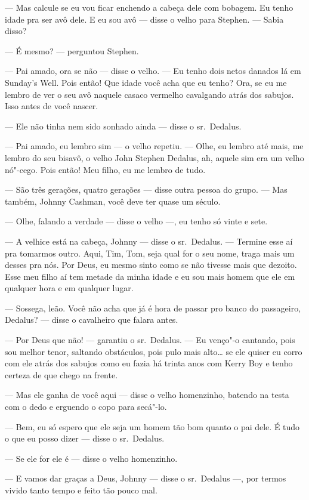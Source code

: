  --- Mas calcule se eu vou ficar enchendo a cabeça dele com bobagem. Eu
tenho idade pra ser avô dele. E eu sou avô --- disse o velho para Stephen.
 --- Sabia disso?

 --- É mesmo? --- perguntou Stephen.

 --- Pai amado, ora se não --- disse o velho. --- Eu tenho dois netos danados lá
em Sunday’s Well. Pois então! Que idade você acha que
eu tenho? Ora, se eu me lembro de ver o seu avô naquele casaco vermelho
cavalgando atrás dos sabujos. Isso antes de você nascer.

 --- Ele não tinha nem sido sonhado ainda --- disse o sr.~Dedalus.

 --- Pai amado, eu lembro sim --- o velho repetiu. --- Olhe, eu lembro até mais, me
lembro do seu bisavô, o velho John Stephen Dedalus, ah, aquele sim era
um velho nó"-cego. Pois então! Meu filho, eu me lembro de tudo.

 --- São três gerações, quatro gerações --- disse outra pessoa do grupo. --- Mas também,
Johnny Cashman, você deve ter quase um século.

 --- Olhe, falando a verdade --- disse o velho ---, eu tenho só vinte e sete.

 --- A velhice está na cabeça, Johnny --- disse o sr.~Dedalus. --- Termine esse aí
pra tomarmos outro. Aqui, Tim, Tom, seja qual for o seu nome, traga mais
um desses pra nós. Por Deus, eu mesmo sinto como se não tivesse mais
que dezoito. Esse meu filho aí tem metade da minha idade e eu sou mais
homem que ele em qualquer hora e em qualquer lugar.

 --- Sossega, leão. Você não acha que já é hora de passar pro banco do
passageiro, Dedalus? --- disse o cavalheiro que falara antes.

 --- Por Deus que não! --- garantiu o sr.~Dedalus. --- Eu venço"-o cantando, pois
sou melhor tenor, saltando obstáculos, pois pulo mais alto\ldots{} se ele
quiser eu corro com ele atrás dos sabujos como eu fazia há trinta anos
com Kerry Boy e tenho certeza de que chego na frente.

 --- Mas ele ganha de você aqui --- disse o velho homenzinho, batendo na testa
com o dedo e erguendo o copo para secá"-lo.

 --- Bem, eu só espero que ele seja um homem tão bom quanto o pai dele. É
tudo o que eu posso dizer --- disse o sr.~Dedalus.

 --- Se ele for ele é --- disse o velho homenzinho.

 --- E vamos dar graças a Deus, Johnny --- disse o sr.~Dedalus ---, por termos
vivido tanto tempo e feito tão pouco mal.


